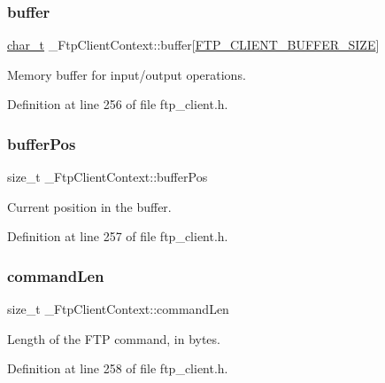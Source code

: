\subsubsection{\texorpdfstring{buffer}{buffer}}
{\footnotesize\ttfamily \hyperlink{compiler__port_8h_a40bb5262bf908c328fbcfbe5d29d0201}{char\+\_\+t} \+\_\+\+Ftp\+Client\+Context\+::buffer\mbox{[}\hyperlink{ftp__client_8h_a686faf7a79b419726b351d164f0f14c4}{F\+T\+P\+\_\+\+C\+L\+I\+E\+N\+T\+\_\+\+B\+U\+F\+F\+E\+R\+\_\+\+S\+I\+ZE}\mbox{]}}



Memory buffer for input/output operations. 



Definition at line 256 of file ftp\+\_\+client.\+h.

\mbox{\label{struct__FtpClientContext_a1b614021b5fd378133771d888909e6ec}} 
\subsubsection{\texorpdfstring{buffer\+Pos}{bufferPos}}
{\footnotesize\ttfamily size\+\_\+t \+\_\+\+Ftp\+Client\+Context\+::buffer\+Pos}



Current position in the buffer. 



Definition at line 257 of file ftp\+\_\+client.\+h.

\mbox{\label{struct__FtpClientContext_a99572d7e4b319a6e6176b160584ea0d9}} 
\subsubsection{\texorpdfstring{command\+Len}{commandLen}}
{\footnotesize\ttfamily size\+\_\+t \+\_\+\+Ftp\+Client\+Context\+::command\+Len}



Length of the F\+TP command, in bytes. 



Definition at line 258 of file ftp\+\_\+client.\+h.

